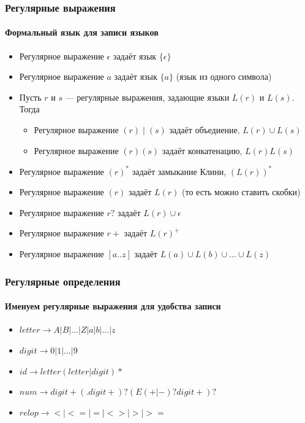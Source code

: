 \documentclass[xetex,mathserif,serif]{beamer}
\begin{document}
	\begin{frame}
		\frametitle{Регулярные выражения}
		\framesubtitle{Формальный язык для записи языков}
		\begin{itemize}
			\item Регулярное выражение $\epsilon$ задаёт язык $\{\epsilon\}$
			\item Регулярное выражение $a$ задаёт язык $\{a\}$ (язык из одного символа)
			\item Пусть $r$ и $s$ --- регулярные выражения, задающие языки $L(r)$ и $L(s)$. Тогда
			\begin{itemize}
				\item Регулярное выражение $(r) \mid (s)$ задаёт объедиение, $L(r) \cup L(s)$
				\item Регулярное выражение $(r)(s)$ задаёт конкатенацию, $L(r)L(s)$
			\end{itemize}
			\item Регулярное выражение $(r)^*$ задаёт замыкание Клини, $(L(r))^*$
			\item Регулярное выражение $(r)$ задаёт $L(r)$ (то есть можно ставить скобки)
			\item Регулярное выражение $r?$ задаёт $L(r) \cup \epsilon$
			\item Регулярное выражение $r+$ задаёт $L(r)^+$
			\item Регулярное выражение $[a..z]$ задаёт $L(a) \cup L(b) \cup \ldots \cup L(z)$
		\end{itemize}
	\end{frame}

	\begin{frame}
		\frametitle{Регулярные определения}
		\framesubtitle{Именуем регулярные выражения для удобства записи}
		\begin{itemize}
			\item $letter \rightarrow A | B | ... | Z | a | b | ... | z$
			\item $digit \rightarrow 0 | 1 | ... | 9$
			\item $id \rightarrow letter (letter | digit)*$
			\item $num \rightarrow digit+ (. digit+)? (E(+ | -)? digit+)?$
			\item $relop \rightarrow < | <= | = | <> | > | >=$
		\end{itemize}
	\end{frame}
\end{document}
